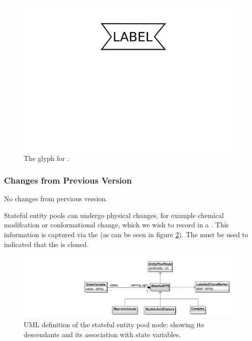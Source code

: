 \begin{figure}[htb]
  \centering
  \includegraphics[scale = 0.3]{images/perturbing_agent}
  \caption{The \PD glyph for .}
  \label{fig:techref:perturbing agent}
\end{figure}

\subsubsection{Changes from Previous Version}

No changes from pervious version.

\label{defn:StatefulEPN}

Stateful entity pools can undergo physical changes, for example
chemical modifcation or conformational change, which we wish to record
in a \PDm. This information is captured via the
 (as can be seen in figure
\ref{fig:techref:statefulepnuml}). The  must be
used to indicated that the  is cloned.

\begin{figure}[htb]
  \centering
  \includegraphics[width=\textwidth]{images/statefulepnuml}
\caption{UML definition of the stateful entity pool node: showing its
  descendants and its association with state variables.}
  \label{fig:techref:statefulepnuml}
\end{figure}

